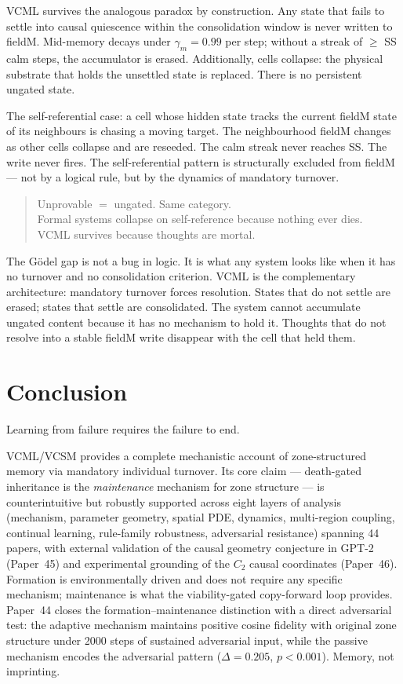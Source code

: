 \documentclass[11pt]{article}
\begin{document}
VCML survives the analogous paradox by construction.
Any state that fails to settle into causal quiescence within the consolidation window
is never written to fieldM.
Mid-memory decays under $\gamma_m = 0.99$ per step;
without a streak of $\geq$ SS calm steps, the accumulator is erased.
Additionally, cells collapse: the physical substrate that holds the unsettled state
is replaced.
There is no persistent ungated state.

The self-referential case: a cell whose hidden state tracks the current fieldM state
of its neighbours is chasing a moving target.
The neighbourhood fieldM changes as other cells collapse and are reseeded.
The calm streak never reaches SS.
The write never fires.
The self-referential pattern is structurally excluded from fieldM --- not by a logical
rule, but by the dynamics of mandatory turnover.

\begin{quote}
  Unprovable $=$ ungated. Same category.\\
  Formal systems collapse on self-reference because nothing ever dies.\\
  VCML survives because thoughts are mortal.
\end{quote}

The G\"{o}del gap is not a bug in logic.
It is what any system looks like when it has no turnover and no consolidation criterion.
VCML is the complementary architecture: mandatory turnover forces resolution.
States that do not settle are erased; states that settle are consolidated.
The system cannot accumulate ungated content because it has no mechanism to hold it.
Thoughts that do not resolve into a stable fieldM write disappear with the cell that held them.

\section{Conclusion}

Learning from failure requires the failure to end.

VCML/VCSM provides a complete mechanistic account of zone-structured memory via mandatory
individual turnover.
Its core claim --- death-gated inheritance is the \emph{maintenance} mechanism for zone
structure --- is counterintuitive but robustly supported across eight layers of analysis
(mechanism, parameter geometry, spatial PDE, dynamics, multi-region coupling, continual
learning, rule-family robustness, adversarial resistance) spanning 44 papers,
with external validation of the causal geometry conjecture in GPT-2 (Paper~45)
and experimental grounding of the $C_2$ causal coordinates (Paper~46).
Formation is environmentally driven and does not require any specific mechanism;
maintenance is what the viability-gated copy-forward loop provides.
Paper~44 closes the formation--maintenance distinction with a direct adversarial test:
the adaptive mechanism maintains positive cosine fidelity with original zone structure
under 2000 steps of sustained adversarial input, while the passive mechanism encodes
the adversarial pattern ($\Delta = 0.205$, $p < 0.001$).
Memory, not imprinting.
\end{document}
